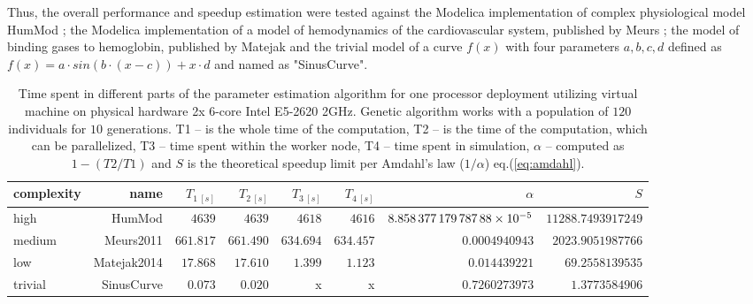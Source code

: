 Thus, the overall performance and speedup estimation were tested against the Modelica implementation of complex physiological model HumMod \cite{Kofranek2011hummod}; the Modelica implementation of a model of hemodynamics of the cardiovascular system, published by Meurs \cite{Meurs2011}; the model of binding gases to hemoglobin, published by Matejak \cite{Matejak2014sj} and the trivial model of a curve $f(x)$ with four parameters $a,b,c,d$ defined as $ f(x)=a\cdot sin(b\cdot (x-c))+x\cdot d$ and named as "SinusCurve".
\begin{table}[htb]
\footnotesize
\begin{tabular}{|l|r|r|r|r|r|r|r|}
\hline
complexity & name & $T_{1~[s]}$ & $T_{2~[s]}$ & $T_{3~[s]}$ & $T_{4~[s]}$ & $\alpha$ & $S$ \\
\hline
high & HumMod \cite{Kofranek2011hummod} & $\num{4639}$ & $\num{4639}$ & $\num{4618}$ & $\num{4616}$ & $\num{8.85837717978788E-005}$ & $\num{11288.7493917249}$ \\
medium & Meurs2011\cite{Meurs2011} & $\num{661.817}$ & $\num{661.490}$ & $\num{634.694}$ & $\num{634.457}$ & $\num{0.0004940943}$ & $\num{2023.9051987766}$ \\
low & Matejak2014\cite{Matejak2014sj} & $\num{17.868}$ & $\num{17.610}$ & $\num{1.399}$ & $\num{1.123}$ & $\num{0.014439221}$ & $\num{69.2558139535}$ \\
trivial & SinusCurve & $0.073$ & $0.020$ & x & x &  $\num{0.7260273973}$ & $\num{1.3773584906}$\\
\hline
\end{tabular}
\caption{Time spent in different parts of the parameter estimation algorithm for one processor deployment utilizing virtual machine on physical hardware 2x 6-core Intel E5-2620 2GHz. Genetic algorithm works with a population of $120$ individuals for $10$ generations. T1 -- is the whole time of the computation, T2 -- is the time of the computation, which can be parallelized, T3 -- time spent within the worker node, T4 -- time spent in simulation, $\alpha$ -- computed as $1-(T2/T1)$ and $S$ is the theoretical speedup limit per Amdahl's law ($1/\alpha$) eq.(\ref{eq:amdahl}).}
\label{table:speedupresult}
\end{table}

